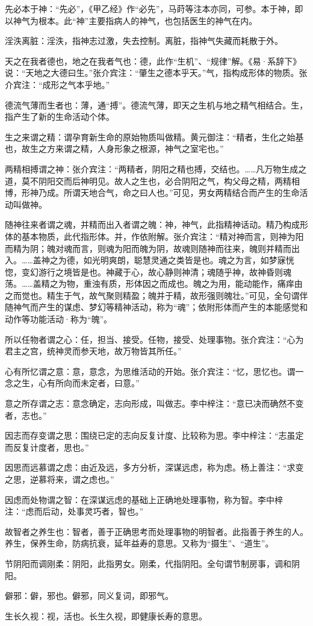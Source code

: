\documentclass[12pt]{ctexbook}
\begin{document}
\begin{jiaozhu}
	\item 先必本于神：“先必”，《甲乙经》作“必先”，马莳等注本亦同，可参。本于神，即以神气为根本。此“神”主要指病人的神气，也包括医生的神气在内。
	\item 淫泆离脏：淫泆，指神志过激，失去控制。离脏，指神气失藏而耗散于外。
	\item 天之在我者德也，地之在我者气也：德，此作“生机”、“规律”解。《易·系辞下》说：“天地之大德曰生。”张介宾注：“肇生之德本乎天。”气，指构成形体的物质。张介宾注：“成形之气本乎地。”
	\item 德流气薄而生者也：薄，通“搏”。德流气薄，即天之生机与地之精气相结合。生，指产生了新的生命活动个体。
	\item 生之来谓之精：谓孕育新生命的原始物质叫做精。黄元御注：“精者，生化之始基也，故生之方来谓之精，人身形象之根源，神气之室宅也。”
	\item 两精相搏谓之神：张介宾注：“两精者，阴阳之精也搏，交结也。……凡万物生成之道，莫不阴阳交而后神明见。故人之生也，必合阴阳之气，构父母之精，两精相博，形神乃成。所谓天地合气，命之曰人也。”可见，男女两精结合而产生的生命活动叫做神。
	\item 随神往来者谓之魂，并精而出入者谓之魄：神，神气，此指精神话动。精乃构成形体的基本物质，此代指形体。并，作依附解。张介宾注：“精对神而言，则神为阳而精为阴；魄对魂而言，则魂为阳而魄为阴，故魂则随神而往来，魄则并精而出入。……盖神之为德，如光明爽朗，聪慧灵通之类皆是也。魂之为言，如梦寐恍惚，变幻游行之境皆是也。神藏于心，故心静则神清；魂随乎神，故神昏则魂荡。……盖精之为物，重浊有质，形体因之而成也。魄之为用，能动能作，痛痒由之而觉也。精生于气，故气聚则精盈；魄并于精，故形强则魄壮。”可见，全句谓伴随神气而产生的谋虑、梦幻等精神活动，称为“魂”；依附形体而产生的本能感觉和动作等功能活动·称为“魄”。
	\item 所以任物者谓之心：任，担当、接受。任物，接受、处理事物。张介宾注：“心为君主之宫，统神灵而参天地，故万物皆其所任。”
	\item 心有所忆谓之意：意，意念，为思维活动的开始。张介宾注：“忆，思忆也。谓一念之生，心有所向而未定者，曰意。”
	\item 意之所存谓之志：意念确定，志向形成，叫做志。李中梓注：“意已决而确然不变者，志也。”
	\item 因志而存变谓之思：围绕已定的志向反复计度、比较称为思。李中梓注：“志虽定而反复计度者，思也。”
	\item 因思而远慕谓之虑：由近及远，多方分析，深谋远虑，称为虑。杨上善注：“求变之思，逆慕将来，谓之虑也。”
	\item 因虑而处物谓之智：在深谋远虑的基础上正确地处理事物，称为智。李中梓注：“虑而后动，处事灵巧者，智也。”
	\item 故智者之养生也：智者，善于正确思考而处理事物的明智者。此指善于养生的人。养生，保养生命，防病抗衰，延年益寿的意思。又称为“摄生”、“道生”。
	\item 节阴阳而调刚柔：阴阳，此指男女。刚柔，代指阴阳。全句谓节制房事，调和阴阳。
	\item 僻邪：僻，邪也。僻邪，同义复词，即邪气。
	\item 生长久视：视，活也。长生久视，即健康长寿的意思。
\end{jiaozhu}
\end{document}
